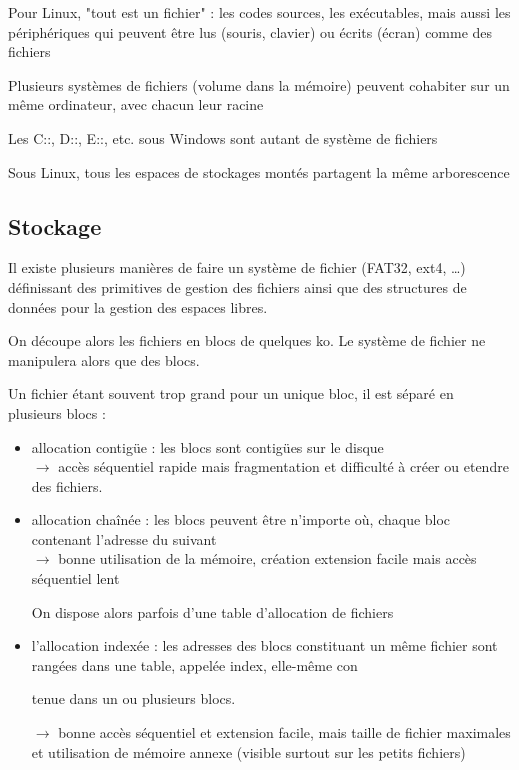 \begin{rem}
	Pour Linux, "tout est un fichier" : les codes sources, les exécutables, mais aussi les périphériques qui peuvent être lus (souris, clavier) ou écrits (écran) comme des fichiers
\end{rem}

\begin{proposition}
	Plusieurs systèmes de fichiers (volume dans la mémoire) peuvent cohabiter sur un même ordinateur, avec chacun leur racine
\end{proposition}

\begin{example}
	Les C::, D::, E::, etc. sous Windows sont autant de système de fichiers
\end{example}

\begin{rem}
	Sous Linux, tous les espaces de stockages montés partagent la même arborescence
\end{rem}

\subsection{Stockage}

Il existe plusieurs manières de faire un système de fichier (FAT32, ext4, \dots) définissant des primitives de gestion des fichiers ainsi que des structures de données pour la gestion des espaces libres.

\begin{definition}
	On découpe alors les fichiers en blocs de quelques ko. Le système de fichier ne manipulera alors que des blocs.
\end{definition}

\begin{definition}
	Un fichier étant souvent trop grand pour un unique bloc, il est séparé en plusieurs blocs : \begin{itemize}
	
	\item allocation contigüe : les blocs sont contigües sur le disque \\
	$\to$ accès séquentiel rapide mais fragmentation et difficulté à créer ou etendre des fichiers.
	
	\item allocation chaînée : les blocs peuvent être n'importe où, chaque bloc contenant l'adresse du suivant\\
	$\to$ bonne utilisation de la mémoire, création extension facile mais accès séquentiel lent
	
	On dispose alors parfois d'une table d'allocation de fichiers
	
	\item l’allocation indexée : les adresses des blocs constituant un même ﬁchier sont rangées dans une table, appelée index, elle-même con
	
	tenue dans un ou plusieurs blocs.
	
	$\to$ bonne accès séquentiel et extension facile, mais taille de fichier maximales et utilisation de mémoire annexe (visible surtout sur les petits fichiers)
	\end{itemize}
\end{definition}


